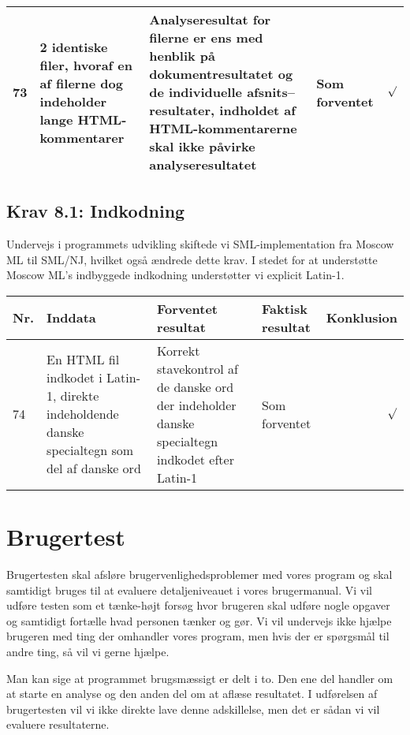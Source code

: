\documentclass[a4paper,oneside,article]{memoir}
\begin{document}
\begin{landscape}
\begin{longtable}[c]{p{20pt}|p{220pt}|p{130pt}|p{130pt}|p{50pt}}
73 &
2 identiske filer, hvoraf en af filerne dog indeholder lange HTML-kommentarer &
Analyseresultat for filerne er ens med henblik på
dokumentresultatet og de individuelle afsnits--resultater, indholdet
af HTML-kommentarerne skal ikke påvirke analyseresultatet &
Som forventet &
$\surd$ \\ \hline

\end{longtable}

\section{Krav 8.1: Indkodning}

Undervejs i programmets udvikling skiftede vi SML-implementation fra
Moscow ML til SML/NJ, hvilket også ændrede dette krav. I stedet for at
understøtte Moscow ML's indbyggede indkodning understøtter vi explicit
Latin-1.

\begin{longtable}[c]{p{20pt}|p{220pt}|p{130pt}|p{130pt}|r}
\textbf{Nr.} &
\textbf{Inddata} &
\textbf{Forventet resultat} &
\textbf{Faktisk resultat} &
\textbf{Konklusion} \\ \hline

74 &
En HTML fil indkodet i Latin-1, direkte indeholdende danske
specialtegn som del af danske ord &
Korrekt stavekontrol af de danske ord der indeholder danske
specialtegn indkodet efter Latin-1 &
Som forventet &
$\surd$ \\ \hline

\end{longtable}
\end{landscape}

\chapter{Brugertest}
Brugertesten skal afsløre brugervenlighedsproblemer med vores program
og skal samtidigt bruges til at evaluere detaljeniveauet i vores
brugermanual. Vi vil udføre testen som et tænke-højt forsøg hvor
brugeren skal udføre nogle opgaver og samtidigt fortælle hvad personen
tænker og gør. Vi vil undervejs ikke hjælpe brugeren med ting der
omhandler vores program, men hvis der er spørgsmål til andre ting, så
vil vi gerne hjælpe.

Man kan sige at programmet brugsmæssigt er delt i to. Den ene del
handler om at starte en analyse og den anden del om at aflæse
resultatet. I udførelsen af brugertesten vil vi ikke direkte lave
denne adskillelse, men det er sådan vi vil evaluere resultaterne.
\newpage
\end{document}

